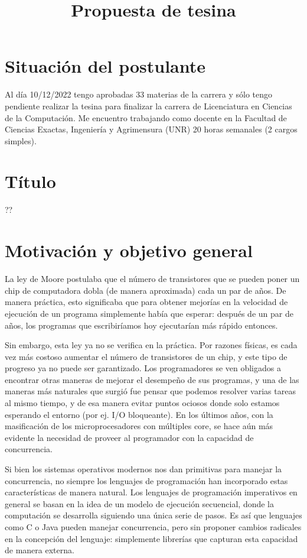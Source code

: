 \documentclass[11pt,a4paper]{article}
\title{\textbf{Propuesta de tesina}}
\date{}
\begin{document}
\maketitle


\section{Situación del postulante}

Al día 10/12/2022 tengo aprobadas 33 materias de la carrera y sólo
tengo pendiente realizar la tesina para finalizar la carrera de
Licenciatura en Ciencias de la Computación. Me encuentro trabajando
como docente en la Facultad de Ciencias Exactas, Ingeniería y
Agrimensura (UNR) 20 horas semanales (2 cargos simples).

\section{Título}

??

\section{Motivación y objetivo general}

La ley de Moore postulaba que el número de transistores que se pueden
poner un chip de computadora dobla (de manera aproximada) cada un par
de años. De manera práctica, esto significaba que para obtener
mejorías en la velocidad de ejecución de un programa simplemente había
que esperar: después de un par de años, los programas que escribiríamos
hoy ejecutarían más rápido entonces.

Sin embargo, esta ley ya no se verifica en la práctica. Por razones
físicas, es cada vez más costoso aumentar el número de transistores de
un chip, y este tipo de progreso ya no puede ser garantizado. Los
programadores se ven obligados a encontrar otras maneras de mejorar el
desempeño de sus programas, y una de las maneras más naturales que
surgió fue pensar que podemos resolver varias tareas al mismo tiempo,
y de esa manera evitar puntos ociosos donde solo estamos esperando el
entorno (por ej. I/O bloqueante). En los últimos años, con la
masificación de los microprocesadores con múltiples core, se hace aún
más evidente la necesidad de proveer al programador con la capacidad
de concurrencia.

Si bien los sistemas operativos modernos nos dan primitivas para
manejar la concurrencia, no siempre los lenguajes de programación han
incorporado estas características de manera natural. Los lenguajes de
programación imperativos en general se basan en la idea de un modelo
de ejecución secuencial, donde la computación se desarrolla siguiendo
una única serie de pasos. Es así que lenguajes como C o Java pueden
manejar concurrencia, pero sin proponer cambios radicales en la
concepción del lenguaje: simplemente librerías que capturan esta
capacidad de manera externa.
\end{document}
